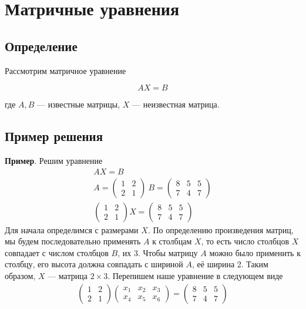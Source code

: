 \documentclass[]{article}
\begin{document}
\section{Матричные уравнения}
\subsection{Определение}
Рассмотрим матричное уравнение 

\begin{equation}
	AX=B
\end{equation}

где $A,B$ --- известные матрицы, $X$ --- неизвестная матрица.

\subsection{Пример решения}
\textbf{Пример}. Решим уравнение 
\begin{gather*}
	AX=B
	\\
	A=
	\begin{pmatrix}
		1 & 2
		\\
		2 & 1
	\end{pmatrix}
\
B=
	\begin{pmatrix}
	8 & 5 & 5
	\\
	7 & 4 & 7
\end{pmatrix}
\\
\begin{pmatrix}
	1 & 2
	\\
	2 & 1
\end{pmatrix}
X
=
	\begin{pmatrix}
	8 & 5 & 5
	\\
	7 & 4 & 7
\end{pmatrix}
\end{gather*}
Для начала определимся с размерами $X$. По определению произведения матриц, мы будем последовательно применять $A$ к столбцам $X$, то есть число столбцов $X$ совпадает с числом столбцов $B$, их 3. Чтобы матрицу $A$ можно было применить к столбцу, его высота должна совпадать с шириной $A$, её ширина 2. Таким образом, $X$ --- матрица $2\times 3$. Перепишем наше уравнение в следующем виде
\begin{gather*}
	\begin{pmatrix}
		1 & 2
		\\
		2 & 1
	\end{pmatrix}
	\begin{pmatrix}
	x_1 & x_2 & x_3
	\\
	x_4 & x_5 & x_6
\end{pmatrix}
	=
	\begin{pmatrix}
		8 & 5 & 5
		\\
		7 & 4 & 7
	\end{pmatrix}
\end{gather*}
\end{document}
